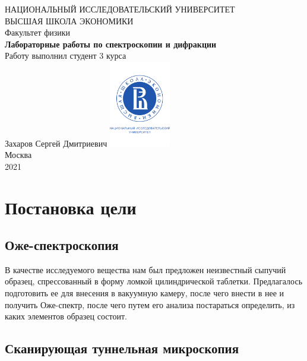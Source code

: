 \documentclass[a4paper, 12pt]{article}
\begin{document}
	\begin{titlepage}
		\begin{center}
			$$$$
			$$$$
			$$$$
			$$$$
			{\Large{НАЦИОНАЛЬНЫЙ ИССЛЕДОВАТЕЛЬСКИЙ УНИВЕРСИТЕТ}}\\
			\vspace{0.1cm}
			{\Large{ВЫСШАЯ ШКОЛА ЭКОНОМИКИ}}\\
			\vspace{0.25cm}
			{\large{Факультет физики}}\\
			\vspace{5.5cm}
			{\Huge\textbf{{Лабораторные работы по спектроскопии и дифракции}}}\\%
			\vspace{1cm}
			{Работу выполнил студент 3 курса}\\
			{Захаров Сергей Дмитриевич}
			\vfill
			\includegraphics[width = 0.2\textwidth]{HSElogo}\\
			\vfill
			Москва\\
			2021
		\end{center}
	\end{titlepage}
	
\tableofcontents

\newpage

\section{Постановка цели}

\subsection{Оже-спектроскопия}

В качестве исследуемого вещества нам был предложен неизвестный сыпучий образец, спрессованный в форму ломкой цилиндрической таблетки. Предлагалось подготовить ее для внесения в вакуумную камеру, после чего внести в нее и получить Оже-спектр, после чего путем его анализа постараться определить, из каких элементов образец состоит.

\subsection{Сканирующая туннельная микроскопия}
\end{document}
